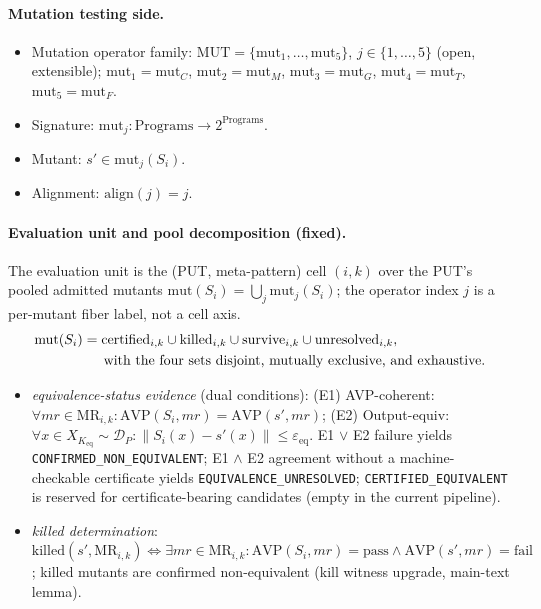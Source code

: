 \documentclass[review,12pt,authoryear]{elsarticle}
\begin{document}
\paragraph{Mutation testing side.}
\begin{itemize}
\item Mutation operator family: $\mathrm{MUT} = \{\mathrm{mut}_1, \ldots, \mathrm{mut}_5\}$, $j \in \{1,\ldots,5\}$ (open, extensible); $\mathrm{mut}_1 = \mathrm{mut}_C$, $\mathrm{mut}_2 = \mathrm{mut}_M$, $\mathrm{mut}_3 = \mathrm{mut}_G$, $\mathrm{mut}_4 = \mathrm{mut}_T$, $\mathrm{mut}_5 = \mathrm{mut}_F$.
\item Signature: $\mathrm{mut}_j : \text{Programs} \to 2^{\text{Programs}}$.
\item Mutant: $s' \in \mathrm{mut}_j(S_i)$.
\item Alignment: $\mathrm{align}(j) = j$.
\end{itemize}

\paragraph{Evaluation unit and pool decomposition (fixed).}
The evaluation unit is the (PUT, meta-pattern) cell $(i,k)$ over the
PUT's pooled admitted mutants
$\mathrm{mut}(S_i) = \bigcup_j \mathrm{mut}_j(S_i)$; the operator index
$j$ is a per-mutant fiber label, not a cell axis.
\[
\begin{aligned}
\mathrm{mut}(S_i)
  &= \mathrm{certified}_{i,k} \cup \mathrm{killed}_{i,k}
     \cup \mathrm{survive}_{i,k} \cup \mathrm{unresolved}_{i,k},\\
&\hspace{1.5em}\text{with the four sets disjoint, mutually exclusive, and exhaustive.}
\end{aligned}
\]
\begin{itemize}
\item \emph{equivalence-status evidence} (dual conditions):
  (E1) AVP-coherent: $\forall \mathit{mr} \in \mathrm{MR}_{i,k}: \mathrm{AVP}(S_i, \mathit{mr}) = \mathrm{AVP}(s', \mathit{mr})$;
  (E2) Output-equiv: $\forall x \in X_{K_{\mathrm{eq}}} \sim \mathcal{D}_P: \|S_i(x) - s'(x)\| \leq \varepsilon_{\mathrm{eq}}$.
  E1 $\vee$ E2 failure yields \texttt{CONFIRMED\_NON\_EQUIVALENT}; E1
  $\wedge$ E2 agreement without a machine-checkable certificate yields
  \texttt{EQUIVALENCE\_UNRESOLVED}; \texttt{CERTIFIED\_EQUIVALENT} is
  reserved for certificate-bearing candidates (empty in the current
  pipeline).
\item \emph{killed determination}: $\mathrm{killed}(s', \mathrm{MR}_{i,k}) \Leftrightarrow \exists \mathit{mr} \in \mathrm{MR}_{i,k}: \mathrm{AVP}(S_i, \mathit{mr}) = \text{pass} \wedge \mathrm{AVP}(s', \mathit{mr}) = \text{fail}$; killed mutants are confirmed non-equivalent (kill witness upgrade, main-text lemma).
\end{itemize}
\end{document}
